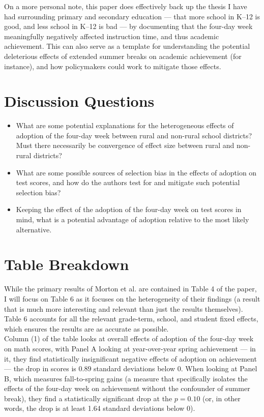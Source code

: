 \documentclass[10pt]{extarticle}
\begin{document}
  On a more personal note, this paper does effectively back up the thesis I have had surrounding primary and secondary education --- that more school in K--12 is good, and less school in K--12 is bad --- by documenting that the four-day week meaningfully negatively affected instruction time, and thus academic achievement. This can also serve as a template for understanding the potential deleterious effects of extended summer breaks on academic achievement (for instance), and how policymakers could work to mitigate those effects.
  \section{Discussion Questions}%
  \begin{itemize}
    \item What are some potential explanations for the heterogeneous effects of adoption of the four-day week between rural and non-rural school districts? Must there necessarily be convergence of effect size between rural and non-rural districts?
    \item What are some possible sources of selection bias in the effects of adoption on test scores, and how do the authors test for and mitigate such potential selection bias?
    \item Keeping the effect of the adoption of the four-day week on test scores in mind, what is a potential advantage of adoption relative to the most likely alternative.
  \end{itemize}
  \section{Table Breakdown}%
  While the primary results of Morton et al. are contained in Table 4 of the paper, I will focus on Table 6 as it focuses on the heterogeneity of their findings (a result that is much more interesting and relevant than just the results themselves). Table 6 accounts for all the relevant grade-term, school, and student fixed effects, which ensures the results are as accurate as possible.\\

  Column (1) of the table looks at overall effects of adoption of the four-day week on math scores, with Panel A looking at year-over-year spring achievement --- in it, they find statistically insignificant negative effects of adoption on achievement --- the drop in scores is $0.89$ standard deviations below $0$. When looking at Panel B, which measures fall-to-spring gains (a measure that specifically isolates the effects of the four-day week on achievement without the confounder of summer break), they find a statistically significant drop at the $p = 0.10$ (or, in other words, the drop is at least 1.64 standard deviations below $0$).\\
\end{document}
